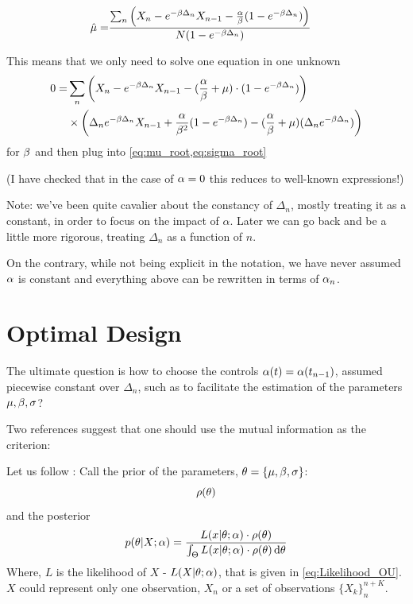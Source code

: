 \documentclass{article}
\begin{document}
\begin{align}
\hat{{\mu }} =&  \frac{ \sum_n \left( X_n - e^{-{\beta} \Delta_n} X_{n-1} -
	\frac{{\alpha}}{{\beta}} ( 1-e^{-{\beta} \Delta_n}) \right)}
	{N ( 1-e^{-{\beta} \Delta_n})}
	\label{eq:mu_root}
\end{align}

This means that we only need to solve one equation in one unknown
\begin{align}
\label{eq:beta_root}
0=& \sum_n \left( X_n - e^{-{\beta} \Delta_n} X_{n-1} -
  (\frac {{{\alpha}}}{{{\beta}}} + {\mu }) \cdot ( 1-e^{-{\beta} \Delta_n})  \right) 
  \\ \notag 
  & \times \left( \Delta_n e^{- {\beta} \Delta_n}X_{n-1} 
  							  + \frac{ {\alpha} } {{\beta}^2} (1-e^{-{\beta} \Delta_n}) 
  					 		  - (\frac {{{\alpha}}}{{{\beta}}} + {\mu }) ( \Delta_n e^{- {\beta} \Delta_n})          
  					 		  \right)
\end{align}
for ${\beta}$ and then plug into \cref{eq:mu_root,eq:sigma_root}

(I have checked that in the case of ${\alpha}=0$ this reduces to well-known
expressions!)

Note: we've been quite cavalier about the constancy of $\Delta_n$, mostly
treating it as a constant, in order to focus on the impact of $\alpha$. Later we
can go back and be a little more rigorous, treating $\Delta_n$ as a function of
$n$.
 
On the contrary, while not being explicit in the notation, we have never assumed
${\alpha}$ is constant and everything above can be rewritten in terms of ${\alpha}_n$.

\section{Optimal Design}
The ultimate question is how to choose the controls ${\alpha}(t) = {\alpha}(t_{n-1})$,
assumed piecewise constant over $\Delta_n$, such as to facilitate the estimation of the parameters
${\mu },{\beta},{\sigma }$?

Two references suggest that one should use the mutual information
\cite{Myung2013,Lewi2009} as the criterion:

Let us follow \cite{Myung2013}:
Call the prior of the parameters, ${\theta} = \{{\mu }, {\beta}, {\sigma }\}$:
$$\rho({\theta})$$ and the posterior
\begin{equation}
p({\theta}| X; {\alpha}) =
\frac{L(x|{\theta}; {\alpha})\cdot \rho({\theta})}{\int_\Theta L(x|{\theta}; {\alpha})\cdot \rho({\theta})
\, \mathrm{d} {\theta}}
\label{eq:parameter_posterior_defn}
\end{equation} 
Where, $L$ is the likelihood of $X$ - $ L(X|{\theta}; {\alpha})$, that is given in
\cref{eq:Likelihood_OU}. $X$ could represent only one observation, $X_n$ or a
set of observations $\{X_k\}_n^{n+K}$.
\end{document}
